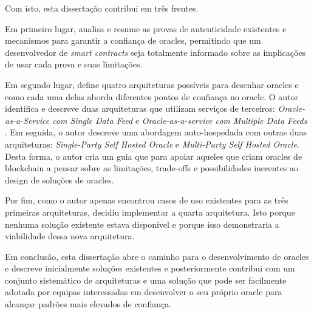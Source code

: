 Com isto, esta dissertação contribui em três frentes.

Em primeiro lugar, analisa e resume as provas de autenticidade existentes e mecanismos para garantir a confiança de oracles, permitindo que um desenvolvedor de \textit{smart contracts} seja totalmente informado sobre as implicações de usar cada prova e suas limitações.

Em segundo lugar, define quatro arquiteturas possíveis para desenhar oracles e como cada uma delas aborda diferentes pontos de confiança no oracle. O autor identifica e descreve duas arquiteturas que utilizam serviços de terceiros: \textit{Oracle-as-a-Service com Single Data Feed} e \textit{Oracle-as-a-service com Multiple Data Feeds} . Em seguida, o autor descreve uma abordagem auto-hospedada com outras duas arquiteturas: \textit{Single-Party Self Hosted Oracle} e \textit{Multi-Party Self Hosted Oracle}. Desta forma, o autor cria um guia que para apoiar aqueles que criam oracles de blockchain a pensar sobre as limitações, trade-offs e possibilidades inerentes ao design de soluções de oracles.

Por fim, como o autor apenas encontrou casos de uso existentes para as três primeiras arquiteturas, decidiu implementar a quarta arquitetura. Isto porque nenhuma solução existente estava disponível e porque isso demonstraria a viabilidade dessa nova arquitetura.

Em conclusão, esta dissertação abre o caminho para o desenvolvimento de oracles e descreve inicialmente soluções existentes e posteriormente contribui com um conjunto sistemático de arquiteturas e uma solução que pode ser facilmente adotada por equipas interessadas em desenvolver o seu próprio oracle para alcançar padrões mais elevados de confiança.

